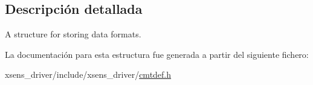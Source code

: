 \subsection{\-Descripción detallada}
\-A structure for storing data formats. 

\-La documentación para esta estructura fue generada a partir del siguiente fichero\-:\begin{DoxyCompactItemize}
\item 
xsens\-\_\-driver/include/xsens\-\_\-driver/\hyperlink{cmtdef_8h}{cmtdef.\-h}\end{DoxyCompactItemize}
